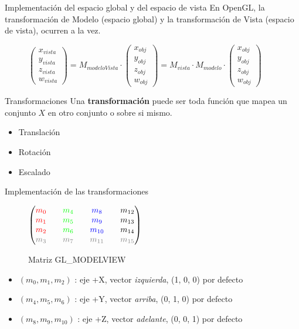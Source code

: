 \documentclass{beamer}
\begin{document}
\begin{frame}{Implementación del espacio global y del espacio de vista}
  En OpenGL, la transformación de Modelo (espacio global) y la transformación de Vista (espacio de vista), ocurren a la vez.
  \begin{figure}[ht]
  \centering
  \(
  \begin{pmatrix}
    x_{vista}\\y_{vista}\\z_{vista}\\w_{vista}
  \end{pmatrix}
  = M_{modeloVista} \cdot
  \begin{pmatrix}
    x_{obj}\\y_{obj}\\z_{obj}\\w_{obj}
  \end{pmatrix}
  = M_{vista} \cdot M_{modelo} \cdot
  \begin{pmatrix}
    x_{obj}\\y_{obj}\\z_{obj}\\w_{obj}
  \end{pmatrix}
  \)
\end{figure}
\end{frame}

\begin{frame}{Transformaciones}
  Una \textbf{transformación} puede ser toda función que mapea un conjunto $X$ en otro conjunto o sobre si mismo.
  \begin{itemize}
  \item{Translación}
  \item{Rotación}
  \item{Escalado}
  \end{itemize}
\end{frame}

\begin{frame}{Implementación de las transformaciones}
  \begin{figure}[ht]
  \centering
  \(
  \begin{pmatrix}
    \textcolor{red}{m_0} && \textcolor{green}{m_4} && \textcolor{blue}{m_8} && m_{12}\\
    \textcolor{red}{m_1} && \textcolor{green}{m_5} && \textcolor{blue}{m_9} && m_{13}\\
    \textcolor{red}{m_2} && \textcolor{green}{m_6} && \textcolor{blue}{m_{10}} && m_{14}\\
    \textcolor{gray}{m_3} && \textcolor{gray}{m_7} && \textcolor{gray}{m_{11}} && \textcolor{gray}{m_{15}}
  \end{pmatrix}
  \)
  \caption*{Matriz GL\_MODELVIEW}
\end{figure}
\begin{itemize}
\item{\((m_0, m_1, m_2)\) : eje +X, vector \textit{izquierda}, (1, 0, 0) por defecto}
\item{\((m_4, m_5, m_6)\) : eje +Y, vector \textit{arriba}, (0, 1, 0) por defecto}
\item{\((m_8, m_9, m_{10})\) : eje +Z, vector \textit{adelante}, (0, 0, 1) por defecto}
\end{itemize}
\end{frame}
\end{document}
